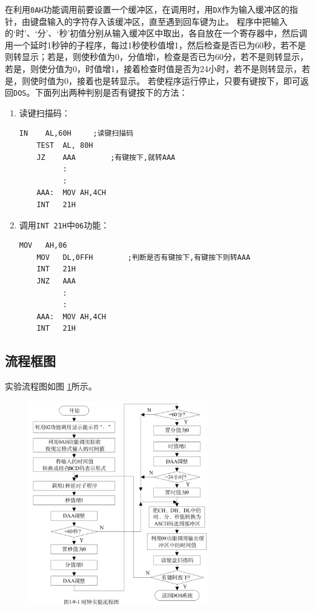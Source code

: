 \documentclass[11pt]{SEU-Digital-Report}
\begin{document}
在利用\texttt{0AH}功能调用前要设置一个缓冲区，在调用时，用\texttt{DX}作为输入缓冲区的指针，由键盘输入的字符存入该缓冲区，直至遇到回车键为止。
程序中把输入的‘时’、‘分’、‘秒’初值分别从输入缓冲区中取出，各自放在一个寄存器中，然后调用一个延时1秒钟的子程序，每过1秒使秒值增1，然后检查是否已为60秒，若不是则转显示；若是，则使秒值为0，分值增l，检查是否已为60分，若不是则转显示，若是，则使分值为0，时值增1，接着检查时值是否为24小时，若不是则转显示，若是，则使时值为0，接着也是转显示。
若使程序运行停止，只要有键按下，即可返回\texttt{DOS}。下面列出两种判别是否有键按下的方法：
\begin{enumerate}
    \item 读键扫描码：\\
\begin{lstlisting}[language={[x86masm]Assembler},title=code]
    IN    AL,60H     ;读键扫描码
    TEST  AL, 80H  
    JZ    AAA        ;有键按下,就转AAA
          :
          :
    AAA:  MOV AH,4CH
    INT   21H  
\end{lstlisting}
    \item 调用\texttt{INT 21H}中\texttt{06}功能：\\
\begin{lstlisting}[language={[x86masm]Assembler},title=code]
    MOV   AH,06
    MOV   DL,0FFH        ;判断是否有键按下,有键按下则转AAA
    INT   21H   
    JNZ   AAA
          :
          :
    AAA:  MOV AH,4CH
    INT   21H
\end{lstlisting}
\end{enumerate}

\subsection{流程框图}
实验流程图如图 \ref{fig:process}所示。
\begin{figure}[htbp]
    \centering
    \includegraphics[width=0.7\textwidth]{fig/process.png}
    \caption{}
    \label{fig:process}
\end{figure}
\end{document}

